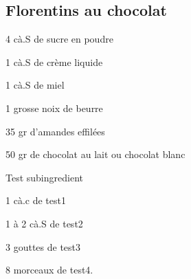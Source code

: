 \setcounter{step}{0}
\subsection{Florentins au chocolat}

\begin{ingredient}

\def\portions{4}%


\begin{main}
	\item 4 cà.S de sucre en poudre
	\item 1 cà.S de crème liquide
	\item 1 cà.S de miel
	\item 1 grosse noix de beurre
	\item 35 gr d’amandes effilées
	\item 50 gr de chocolat au lait ou chocolat blanc
\end{main}
\begin{subingredient}{Test subingredient}
	\item 1 cà.c de test1
	\item 1 à 2 cà.S de test2
	\item 3 gouttes de test3
	\item 8 morceaux de test4.	
\end{subingredient}

\end{ingredient}
